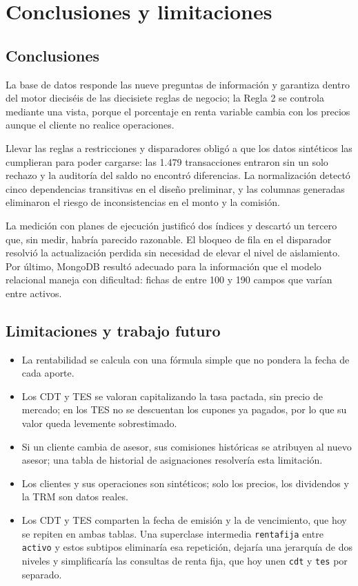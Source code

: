 \documentclass[10pt,letterpaper]{article}
\renewcommand{\_}{\oldUS\allowbreak}
\begin{document}
\section{Conclusiones y limitaciones}

\subsection{Conclusiones}

La base de datos responde las nueve preguntas de información y garantiza dentro del motor dieciséis de las diecisiete reglas de negocio; la Regla 2 se controla mediante una vista, porque el porcentaje en renta variable cambia con los precios aunque el cliente no realice operaciones.

Llevar las reglas a restricciones y disparadores obligó a que los datos sintéticos las cumplieran para poder cargarse: las 1.479 transacciones entraron sin un solo rechazo y la auditoría del saldo no encontró diferencias. La normalización detectó cinco dependencias transitivas en el diseño preliminar, y las columnas generadas eliminaron el riesgo de inconsistencias en el monto y la comisión.

La medición con planes de ejecución justificó dos índices y descartó un tercero que, sin medir, habría parecido razonable. El bloqueo de fila en el disparador resolvió la actualización perdida sin necesidad de elevar el nivel de aislamiento. Por último, MongoDB resultó adecuado para la información que el modelo relacional maneja con dificultad: fichas de entre 100 y 190 campos que varían entre activos.

\subsection{Limitaciones y trabajo futuro}

\begin{itemize}
  \item La rentabilidad se calcula con una fórmula simple que no pondera la fecha de cada aporte.
  \item Los CDT y TES se valoran capitalizando la tasa pactada, sin precio de mercado; en los TES no se descuentan los cupones ya pagados, por lo que su valor queda levemente sobrestimado.
  \item Si un cliente cambia de asesor, sus comisiones históricas se atribuyen al nuevo asesor; una tabla de historial de asignaciones resolvería esta limitación.
  \item Los clientes y sus operaciones son sintéticos; solo los precios, los dividendos y la TRM son datos reales.
  \item Los CDT y TES comparten la fecha de emisión y la de vencimiento, que hoy se repiten en ambas tablas. Una superclase intermedia \texttt{renta\_fija} entre \texttt{activo} y estos subtipos eliminaría esa repetición, dejaría una jerarquía de dos niveles y simplificaría las consultas de renta fija, que hoy unen \texttt{cdt} y \texttt{tes} por separado.
\end{itemize}
\end{document}

